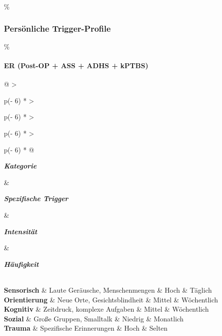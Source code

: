 \hypertarget{persuxf6nliche-trigger-profile}{\%
\subsubsection{\texorpdfstring{\textbf{Persönliche Trigger-Profile}}{Persönliche Trigger-Profile}}\label{persuxf6nliche-trigger-profile}}

\hypertarget{er-post-op-ass-adhs-kptbs}{\%
\paragraph{\texorpdfstring{\textbf{ER (Post-OP + ASS + ADHS + kPTBS)}}{ER (Post-OP + ASS + ADHS + kPTBS)}}\label{er-post-op-ass-adhs-kptbs}}

\begin{longtable}[]{@{}
  >{\raggedright\arraybackslash}p{(\columnwidth - 6\tabcolsep) * }
  >{\raggedright\arraybackslash}p{(\columnwidth - 6\tabcolsep) * }
  >{\raggedright\arraybackslash}p{(\columnwidth - 6\tabcolsep) * }
  >{\raggedright\arraybackslash}p{(\columnwidth - 6\tabcolsep) * }@{}}
\toprule\noalign{}
\begin{minipage}[b]{\linewidth}\raggedright
\emph{\textbf{Kategorie}}
\end{minipage} \& \begin{minipage}[b]{\linewidth}\raggedright
\emph{\textbf{Spezifische Trigger}}
\end{minipage} \& \begin{minipage}[b]{\linewidth}\raggedright
\emph{\textbf{Intensität}}
\end{minipage} \& \begin{minipage}[b]{\linewidth}\raggedright
\emph{\textbf{Häufigkeit}}
\end{minipage} \\
\midrule\noalign{}
\endhead
\bottomrule\noalign{}
\endlastfoot
\textbf{Sensorisch} \& Laute Geräusche, Menschenmengen \& Hoch \& Täglich \\
\textbf{Orientierung} \& Neue Orte, Gesichtsblindheit \& Mittel \& Wöchentlich \\
\textbf{Kognitiv} \& Zeitdruck, komplexe Aufgaben \& Mittel \& Wöchentlich \\
\textbf{Sozial} \& Große Gruppen, Smalltalk \& Niedrig \& Monatlich \\
\textbf{Trauma} \& Spezifische Erinnerungen \& Hoch \& Selten \\
\end{longtable}

